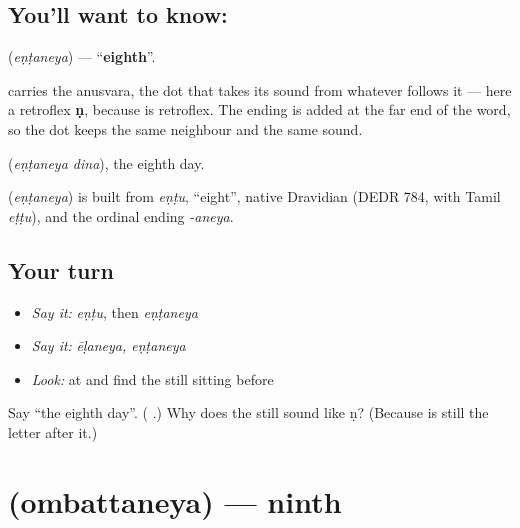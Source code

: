 \subsection*{You'll want to know: }
\textbf{} (\emph{eṇṭaneya}) — \textquotedblleft{}\textbf{eighth}\textquotedblright{}.

\textbf{} carries the \textbf{} anusvara, the dot that takes its sound from whatever follows it — here a retroflex \textbf{ṇ}, because \textbf{} is retroflex. The ending is added at the far end of the word, so the dot keeps the same neighbour and the same sound.

\textbf{ } (\emph{eṇṭaneya dina}), the eighth day.

\begin{cousinweb}
\textbf{} (\emph{eṇṭaneya}) is built from \emph{eṇṭu}, \textquotedblleft{}eight\textquotedblright{}, native Dravidian (DEDR 784, with Tamil \emph{eṭṭu}), and the ordinal ending \emph{-aneya}.
\end{cousinweb}

\subsection*{Your turn}
\begin{itemize}
\raggedright
  \item \emph{Say it:} \emph{eṇṭu}, then \emph{eṇṭaneya}
  \item \emph{Say it:} \emph{ēḷaneya, eṇṭaneya}
  \item \emph{Look:} at  and find the  still sitting before 
\end{itemize}

\begin{tcolorbox}[breakable,colback=teal!4,colframe=teal!35!black,title={Before you move on}]
Say \textquotedblleft{}the eighth day\textquotedblright{}. (\textbf{ }.) Why does the  still sound like ṇ? (Because \textbf{} is still the letter after it.)
\end{tcolorbox}
\section[\texorpdfstring{\kn{ಒಂಬತ್ತನೆಯ} (ombattaneya)}{ಒಂಬತ್ತನೆಯ (ombattaneya)}]{ (ombattaneya) — ninth}

\label{lesson:KA-C75-ninth}



